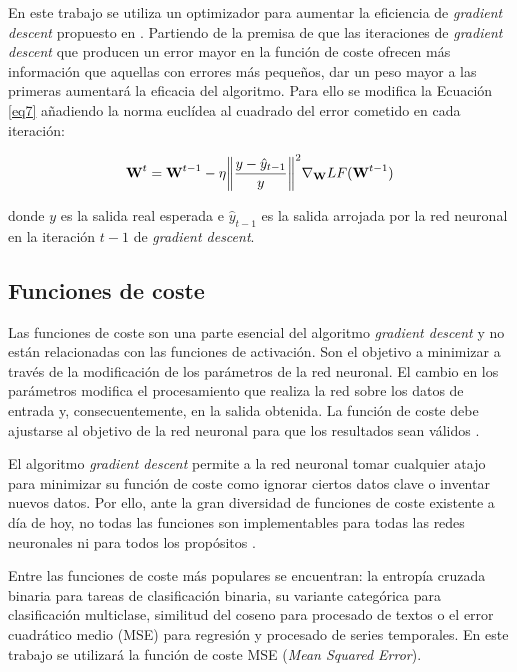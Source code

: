 En este trabajo se utiliza un optimizador para aumentar la eficiencia de \textit{gradient descent} propuesto en \cite{SKIMAcasaseca}. Partiendo de la premisa de que las iteraciones de \textit{gradient descent} que producen un error mayor en la función de coste ofrecen más información que aquellas con errores más pequeños, dar un peso mayor a las primeras aumentará la eficacia del algoritmo. Para ello se modifica la Ecuación \ref{eq7} añadiendo la norma euclídea al cuadrado del error cometido en cada iteración:

\begin{equation}
	\label{eq9} \textbf{W}^t=\textbf{W}^{t-1}-\eta \norm{\frac{y-\hat{y}_{t-1}}{y}}^2 \nabla_\textbf{W}LF(\textbf{W}^{t-1})
\end{equation}

donde $y$ es la salida real esperada e $\hat{y}_{t-1}$ es la salida arrojada por la red neuronal en la iteración $t-1$ de \textit{gradient descent}.

\subsection{Funciones de coste}
Las funciones de coste son una parte esencial del algoritmo \textit{gradient descent} y no están relacionadas con las funciones de activación. Son el objetivo a minimizar a través de la modificación de los parámetros de la red neuronal. El cambio en los parámetros modifica el procesamiento que realiza la red sobre los datos de entrada y, consecuentemente, en la salida obtenida. La función de coste debe ajustarse al objetivo de la red neuronal para que los resultados sean válidos \cite{machinelearningbook}.

El algoritmo \textit{gradient descent} permite a la red neuronal tomar cualquier atajo para minimizar su función de coste como ignorar ciertos datos clave o inventar nuevos datos. Por ello, ante la gran diversidad de funciones de coste existente a día de hoy, no todas las funciones son implementables para todas las redes neuronales ni para todos los propósitos \cite{machinelearningbook1}.

Entre las funciones de coste más populares se encuentran: la entropía cruzada binaria para tareas de clasificación binaria, su variante categórica para clasificación multiclase, similitud del coseno para procesado de textos o el error cuadrático medio (MSE) para regresión y procesado de series temporales. En este trabajo se utilizará la función de coste MSE (\textit{Mean Squared Error}).



